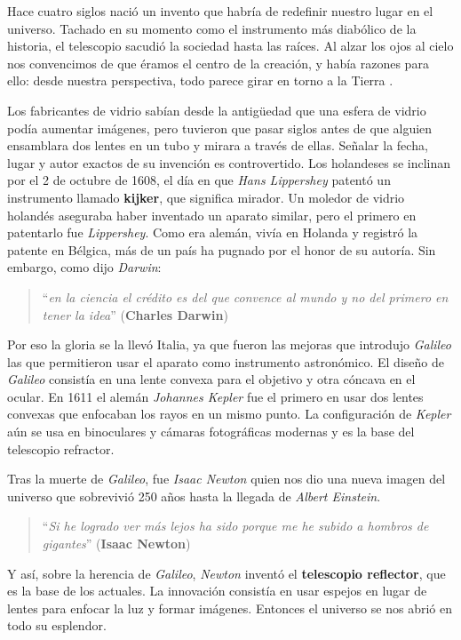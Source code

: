 \bigskip
Hace cuatro siglos nació un invento que habría de redefinir nuestro lugar en el universo. Tachado en su momento como el instrumento más diabólico de la historia, el telescopio sacudió la sociedad hasta las raíces. Al alzar los ojos al cielo nos convencimos de que éramos el centro de la creación, y había razones para ello: desde nuestra perspectiva, todo parece girar en torno a la Tierra \cite{ETL}.

\bigskip
Los fabricantes de vidrio sabían desde la antigüedad que una esfera de vidrio podía aumentar imágenes, pero tuvieron que pasar siglos antes de que alguien ensamblara dos lentes en un tubo y mirara a través de ellas. Señalar la fecha, lugar y autor exactos de su invención es controvertido. Los holandeses se inclinan por el 2 de octubre de 1608, el día en que \textit{Hans Lippershey} patentó un instrumento llamado \textbf{kijker}, que significa mirador. Un moledor de vidrio holandés aseguraba haber inventado un aparato similar, pero el primero en patentarlo fue \textit{Lippershey}. Como era alemán, vivía en Holanda y registró la patente en Bélgica, más de un país ha pugnado por el honor de su autoría. Sin embargo, como dijo \textit{Darwin}:
\begin{quote}``\textit{en la ciencia el crédito es del que convence al mundo y no del primero en tener la idea}''
\newline(\textbf{Charles Darwin})
\end{quote}
Por eso la gloria se la llevó Italia, ya que fueron las mejoras que introdujo \textit{Galileo} las que permitieron usar el aparato como instrumento astronómico. El diseño de \textit{Galileo} consistía en una lente convexa para el objetivo y otra cóncava en el ocular. En 1611 el alemán \textit{Johannes Kepler} fue el primero en usar dos lentes convexas que enfocaban los rayos en un mismo punto. La configuración de \textit{Kepler} aún se usa en binoculares y cámaras fotográficas modernas y es la base del telescopio refractor.

\bigskip
Tras la muerte de \textit{Galileo}, fue \textit{Isaac Newton} quien nos dio una nueva imagen del universo que sobrevivió 250 años hasta la llegada de \textit{Albert Einstein}.

\begin{quote}``\textit{Si he logrado ver más lejos ha sido porque me he subido a hombros de gigantes}''
\newline(\textbf{Isaac Newton})
\end{quote}

Y así, sobre la herencia de \textit{Galileo}, \textit{Newton} inventó el \textbf{telescopio reflector}, que es la base de los actuales. La innovación consistía en usar espejos en lugar de lentes para enfocar la luz y formar imágenes. Entonces el universo se nos abrió en todo su esplendor.

